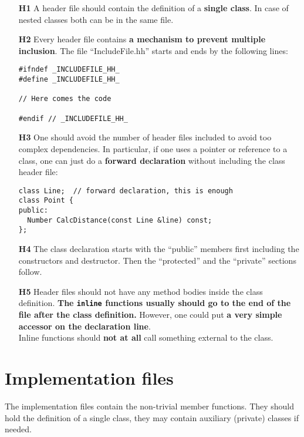 \begin{itemize}
\item[\bf H1] A header file should contain the definition of a {\bf single
    class}. In case of nested classes both can be in the same file.
\item[\bf H2] Every header file contains {\bf a mechanism to prevent multiple
    inclusion}. The file ``IncludeFile.hh'' starts and ends by the 
    following lines:%
    \begin{verbatim}
#ifndef _INCLUDEFILE_HH_
#define _INCLUDEFILE_HH_

// Here comes the code

#endif // _INCLUDEFILE_HH_
    \end{verbatim}
\item[\bf H3] One should avoid the number of header files included to avoid 
  too complex dependencies. In particular, if one uses a pointer or reference 
  to a class, one can just do a {\bf forward declaration} without including
  the class header file:
  \begin{verbatim}
class Line;  // forward declaration, this is enough
class Point {
public:
  Number CalcDistance(const Line &line) const;
};
  \end{verbatim}
\item[\bf H4] The class declaration starts with the ``public'' members
  first including the constructors and destructor. Then the ``protected''
  and the ``private'' sections follow.
\item[\bf H5] Header files should not have any method bodies inside the
  class definition. {\bf The {\tt inline} functions usually should go to
  the end of the file after the class definition.} However, one could put
  {\bf a very simple accessor on the declaration line}.\\
  Inline functions should {\bf not at all} call something external to the
  class.
\end{itemize}

\section{Implementation files}

The implementation files contain the non-trivial member functions. They
should hold the definition of a single class, they may contain auxiliary
(private) classes if needed.

